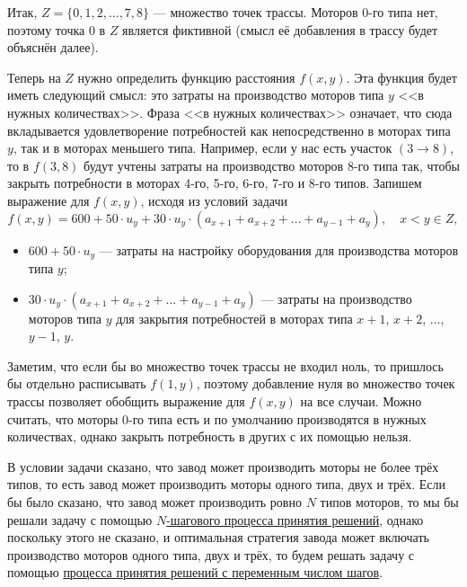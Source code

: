 Итак, $\boxed{Z = \{0, 1, 2, \dots, 7, 8\}}$ --- множество точек трассы. Моторов 0-го типа нет, поэтому точка 0 в $Z$ является фиктивной (смысл её добавления в трассу будет объяснён далее).

Теперь на $Z$ нужно определить функцию расстояния $f(x, y)$. Эта функция будет иметь следующий смысл: это затраты на производство моторов типа $y$ <<в нужных количествах>>. Фраза <<в нужных количествах>> означает, что сюда вкладывается удовлетворение потребностей как непосредственно в моторах типа $y$, так и в моторах меньшего типа. Например, если у нас есть участок $(3 \to 8)$, то в $f(3, 8)$ будут учтены затраты на производство моторов 8-го типа так, чтобы закрыть потребности в моторах 4-го, 5-го, 6-го, 7-го и 8-го типов. Запишем выражение для $f(x, y)$, исходя из условий задачи
\[
\boxed{f(x, y) = 600 + 50 \cdot u_y + 30 \cdot u_y \cdot (a_{x+1} + a_{x+2} + \dots + a_{y-1} + a_y)}, \quad x < y \in Z,
\]

\begin{itemize}[nosep]
	\item $600 + 50 \cdot u_y$ --- затраты на настройку оборудования для производства моторов типа $y$;
	
	\item $30 \cdot u_y \cdot (a_{x+1} + a_{x+2} + \dots + a_{y-1} + a_y)$ --- затраты на производство моторов типа $y$ для закрытия потребностей в моторах типа $x+1$, $x+2$, $\dots$, $y-1$, $y$.
\end{itemize}

Заметим, что если бы во множество точек трассы не входил ноль, то пришлось бы отдельно расписывать $f(1, y)$, поэтому добавление нуля во множество точек трассы позволяет обобщить выражение для $f(x, y)$ на все случаи. Можно считать, что моторы 0-го типа есть и по умолчанию производятся в нужных количествах, однако закрыть потребность в других с их помощью нельзя.

В условии задачи сказано, что завод может производить моторы не более трёх типов, то есть завод может производить моторы одного типа, двух и трёх. Если бы было сказано, что завод может производить ровно $N$ типов моторов, то мы бы решали задачу с помощью \hyperref[alg:n_step_process]{$N$-шагового процесса принятия решений}, однако поскольку этого не сказано, и оптимальная стратегия завода может включать производство моторов одного типа, двух и трёх, то будем решать задачу с помощью \hyperref[alg:unknown_step_process]{процесса принятия решений с переменным числом шагов}.

\solution

